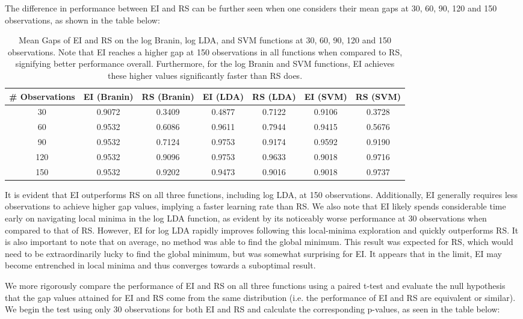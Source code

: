 \documentclass[11pt]{article}
\numberwithin{equation}{section}
\begin{document}
The difference in performance between EI and RS can be further seen when one considers their mean gaps at 30, 60, 90, 120 and 150 observations, as shown in the table below:
\begin{table}[H]
  \centering
  \begin{tabular}{| c | c | c | c | c | c | c |}
    \hline
    \# Observations & EI (Branin) & RS (Branin) & EI (LDA)& RS (LDA) & EI (SVM)& RS (SVM)\\ 
    \hline
    30 & 0.9072 & 0.3409 & 0.4877 & 0.7122 & 0.9106 & 0.3728 \\ 
    \hline
    60 & 0.9532 & 0.6086 & 0.9611 & 0.7944 & 0.9415 & 0.5676 \\ 
    \hline
    90 & 0.9532 & 0.7124 & 0.9753 & 0.9174 & 0.9592 & 0.9190 \\ 
    \hline
    120 & 0.9532 & 0.9096 & 0.9753 & 0.9633 & 0.9018 & 0.9716 \\ 
    \hline
    150 & 0.9532 & 0.9202 & 0.9473 & 0.9016 & 0.9018 & 0.9737 \\ 
    \hline
   \end{tabular}
   \caption{Mean Gaps of EI and RS on the log Branin, log LDA, and SVM functions at 30, 60, 90, 120 and 150 observations. Note that EI reaches a higher gap at 150 observations in all functions when compared to RS, signifying better performance overall. Furthermore, for the log Branin and SVM functions, EI achieves these higher values significantly faster than RS does.}
   \label{tab:ei-rs-observations}
\end{table}

It is evident that EI outperforms RS on all three functions, including log LDA, at 150 observations. 
Additionally, EI generally requires less observations to achieve higher gap values, implying a faster learning rate than RS. We also note that EI likely spends considerable time early on navigating local minima in the log LDA function, 
as evident by its noticeably worse performance at 30 observations when compared to that of RS. However, EI for log LDA rapidly improves following this local-minima exploration and quickly outperforms RS. It is also important to note that on average, no method was able to find the global minimum. This result was expected for RS, which would need to be extraordinarily lucky to find the global minimum, but was somewhat surprising for EI. It appears that in the limit, EI may become entrenched in local minima and thus converges towards a suboptimal result. 

We more rigorously compare the performance of EI and RS on all three functions using a paired t-test and evaluate the null hypothesis that the gap values attained for EI and RS come from the same distribution (i.e. the performance of EI and RS are equivalent or similar). We begin the test using only 30 observations for both EI and RS and calculate the corresponding p-values, as seen in the table below:
\end{document}
